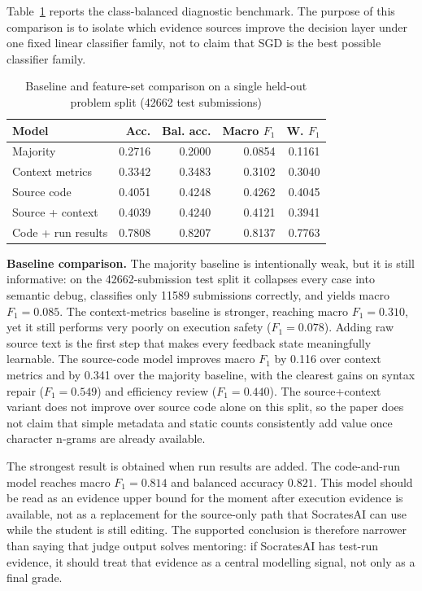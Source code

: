 \documentclass[conference]{IEEEtran}
\begin{document}
Table~\ref{tab:results} reports the class-balanced diagnostic benchmark. The purpose of this comparison is to isolate which evidence sources improve the decision layer under one fixed linear classifier family, not to claim that SGD is the best possible classifier family.

\begin{table}[t]
\caption{Baseline and feature-set comparison on a single held-out problem split (42662 test submissions)}
\label{tab:results}
\centering
\renewcommand{\arraystretch}{1.1}
\begin{tabular}{lrrrr}
\toprule
\textbf{Model} & \textbf{Acc.} & \textbf{Bal. acc.} & \textbf{Macro $F_1$} & \textbf{W. $F_1$} \\
\midrule
Majority & 0.2716 & 0.2000 & 0.0854 & 0.1161 \\
Context metrics & 0.3342 & 0.3483 & 0.3102 & 0.3040 \\
Source code & 0.4051 & 0.4248 & 0.4262 & 0.4045 \\
Source + context & 0.4039 & 0.4240 & 0.4121 & 0.3941 \\
Code + run results & 0.7808 & 0.8207 & 0.8137 & 0.7763 \\
\bottomrule
\end{tabular}
\end{table}

\textbf{Baseline comparison.} The majority baseline is intentionally weak, but it is still informative: on the 42662-submission test split it collapses every case into semantic debug, classifies only 11589 submissions correctly, and yields macro $F_1=0.085$. The context-metrics baseline is stronger, reaching macro $F_1=0.310$, yet it still performs very poorly on execution safety ($F_1=0.078$). Adding raw source text is the first step that makes every feedback state meaningfully learnable. The source-code model improves macro $F_1$ by 0.116 over context metrics and by 0.341 over the majority baseline, with the clearest gains on syntax repair ($F_1=0.549$) and efficiency review ($F_1=0.440$). The source+context variant does not improve over source code alone on this split, so the paper does not claim that simple metadata and static counts consistently add value once character n-grams are already available.

The strongest result is obtained when run results are added. The code-and-run model reaches macro $F_1=0.814$ and balanced accuracy $0.821$. This model should be read as an evidence upper bound for the moment after execution evidence is available, not as a replacement for the source-only path that SocratesAI can use while the student is still editing. The supported conclusion is therefore narrower than saying that judge output solves mentoring: if SocratesAI has test-run evidence, it should treat that evidence as a central modelling signal, not only as a final grade.
\end{document}
